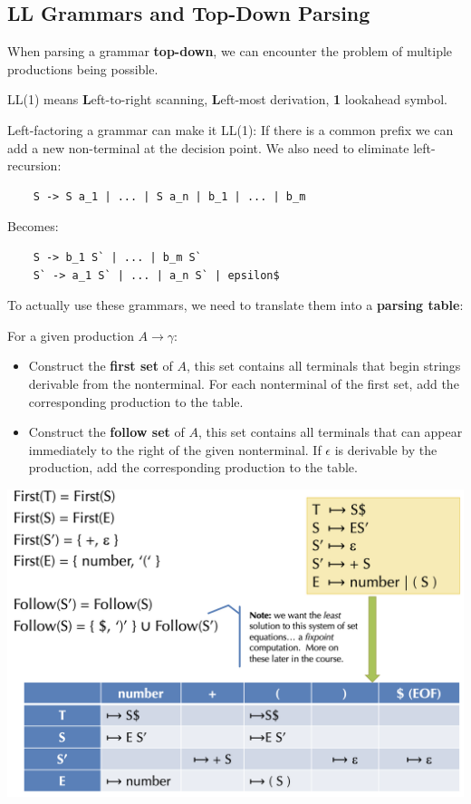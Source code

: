 \subsection*{LL Grammars and Top-Down Parsing}

When parsing a grammar \textbf{top-down}, we can encounter the problem of multiple productions being possible. \medskip
		
LL(1) means \textbf{L}eft-to-right scanning, \textbf{L}eft-most derivation, \textbf{1} lookahead symbol. \medskip
		
Left-factoring a grammar can make it LL(1): If there is a common prefix we can add a new non-terminal at the decision point. We also need to eliminate left-recursion:\smallskip

\begin{lstlisting}
 	S -> S a_1 | ... | S a_n | b_1 | ... | b_m
\end{lstlisting}\smallskip

Becomes:\smallskip

\begin{lstlisting}		
	S -> b_1 S` | ... | b_m S`		
	S` -> a_1 S` | ... | a_n S` | epsilon$
\end{lstlisting}\medskip

To actually use these grammars, we need to translate them into a \textbf{parsing table}: \medskip

For a given production $A \to \gamma$:
\begin{itemize}
	\item Construct the \textbf{first set} of $A$, this set contains all terminals that begin strings derivable from the nonterminal. For each nonterminal of the first set, add the corresponding production to the table.
	
	\item Construct the \textbf{follow set} of $A$, this set contains all terminals that can appear immediately to the right of the given nonterminal. If $\epsilon$ is derivable by the production, add the corresponding production to the table.
\end{itemize}

\begin{center}
	\includegraphics[width=\linewidth]{assets/ll1.png}
\end{center}

